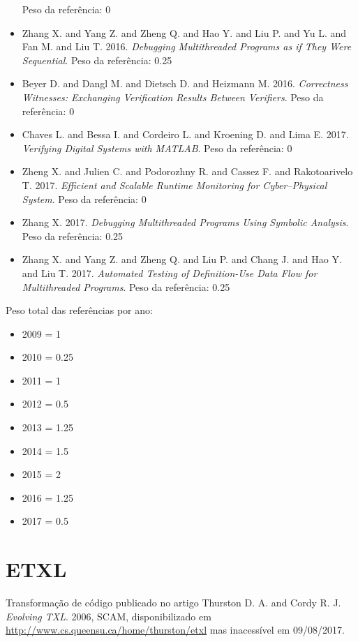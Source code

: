 \begin{itemize}
      Peso da referência: 0
\item Zhang X. and Yang Z. and Zheng Q. and Hao Y. and Liu P. and Yu L. and Fan M. and Liu T.
      2016.
      {\it Debugging Multithreaded Programs as if They Were Sequential}.
      Peso da referência: 0.25
\item Beyer D. and Dangl M. and Dietsch D. and Heizmann M.
      2016.
      {\it Correctness Witnesses: Exchanging Verification Results Between Verifiers}.
      Peso da referência: 0
\item Chaves L. and Bessa I. and Cordeiro L. and Kroening D. and Lima E.
      2017.
      {\it Verifying Digital Systems with MATLAB}.
      Peso da referência: 0
\item Zheng X. and Julien C. and Podorozhny R. and Cassez F. and Rakotoarivelo T.
      2017.
      {\it Efficient and Scalable Runtime Monitoring for Cyber--Physical System}.
      Peso da referência: 0
\item Zhang X.
      2017.
      {\it Debugging Multithreaded Programs Using Symbolic Analysis}.
      Peso da referência: 0.25
\item Zhang X. and Yang Z. and Zheng Q. and Liu P. and Chang J. and Hao Y. and Liu T.
      2017.
      {\it Automated Testing of Definition-Use Data Flow for Multithreaded Programs}.
      Peso da referência: 0.25
\end{itemize}

Peso total das referências por ano:

\begin{itemize}
\item 2009 = 1
\item 2010 = 0.25
\item 2011 = 1
\item 2012 = 0.5
\item 2013 = 1.25
\item 2014 = 1.5
\item 2015 = 2
\item 2016 = 1.25
\item 2017 = 0.5
\end{itemize}


\section{ETXL}

Transformação de código
publicado no artigo
Thurston D. A. and Cordy R. J.
{\it Evolving TXL}.
2006,
SCAM,
disponibilizado em \url{http://www.cs.queensu.ca/home/thurston/etxl}
mas inacessível em 09/08/2017.

